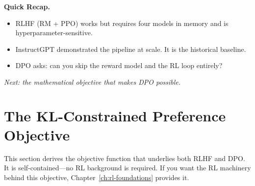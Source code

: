 \begin{quickrecap}
\textbf{Quick Recap.}
\begin{itemize}[nosep,leftmargin=1.5em]
  \item RLHF (RM + PPO) works but requires four models in memory and is hyperparameter-sensitive.
  \item InstructGPT demonstrated the pipeline at scale. It is the historical baseline.
  \item DPO asks: can you skip the reward model and the RL loop entirely?
\end{itemize}
\textit{Next: the mathematical objective that makes DPO possible.}
\end{quickrecap}


\section{The KL-Constrained Preference Objective}
\label{sec:kl-objective}

This section derives the objective function that underlies both RLHF and DPO. It is self-contained---no RL background is required. If you want the RL machinery behind this objective, Chapter~\ref{ch:rl-foundations} provides it.

